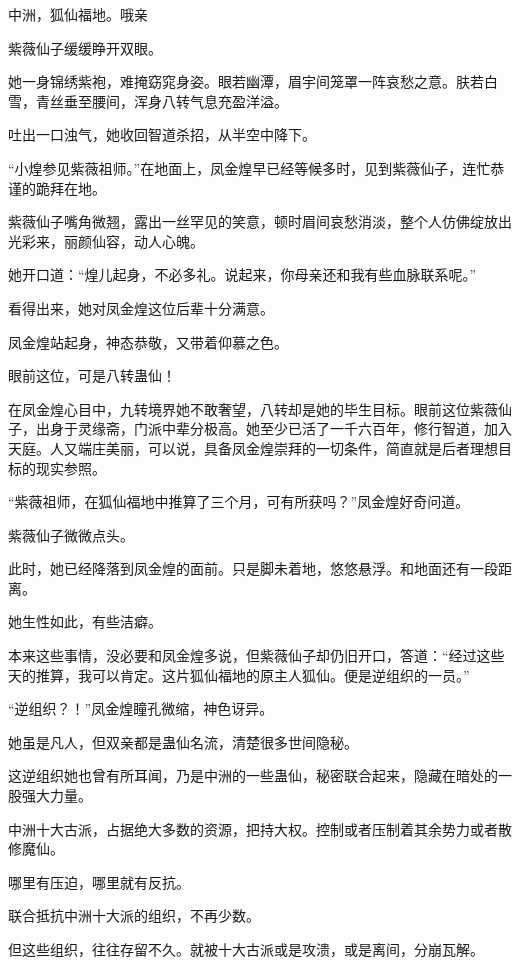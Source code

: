 
\begin{this_body}

中洲，狐仙福地。哦亲

紫薇仙子缓缓睁开双眼。

她一身锦绣紫袍，难掩窈窕身姿。眼若幽潭，眉宇间笼罩一阵哀愁之意。肤若白雪，青丝垂至腰间，浑身八转气息充盈洋溢。

吐出一口浊气，她收回智道杀招，从半空中降下。

“小煌参见紫薇祖师。”在地面上，凤金煌早已经等候多时，见到紫薇仙子，连忙恭谨的跪拜在地。

紫薇仙子嘴角微翘，露出一丝罕见的笑意，顿时眉间哀愁消淡，整个人仿佛绽放出光彩来，丽颜仙容，动人心魄。

她开口道：“煌儿起身，不必多礼。说起来，你母亲还和我有些血脉联系呢。”

看得出来，她对凤金煌这位后辈十分满意。

凤金煌站起身，神态恭敬，又带着仰慕之色。

眼前这位，可是八转蛊仙！

在凤金煌心目中，九转境界她不敢奢望，八转却是她的毕生目标。眼前这位紫薇仙子，出身于灵缘斋，门派中辈分极高。她至少已活了一千六百年，修行智道，加入天庭。人又端庄美丽，可以说，具备凤金煌崇拜的一切条件，简直就是后者理想目标的现实参照。

“紫薇祖师，在狐仙福地中推算了三个月，可有所获吗？”凤金煌好奇问道。

紫薇仙子微微点头。

此时，她已经降落到凤金煌的面前。只是脚未着地，悠悠悬浮。和地面还有一段距离。

她生性如此，有些洁癖。

本来这些事情，没必要和凤金煌多说，但紫薇仙子却仍旧开口，答道：“经过这些天的推算，我可以肯定。这片狐仙福地的原主人狐仙。便是逆组织的一员。”

“逆组织？！”凤金煌瞳孔微缩，神色讶异。

她虽是凡人，但双亲都是蛊仙名流，清楚很多世间隐秘。

这逆组织她也曾有所耳闻，乃是中洲的一些蛊仙，秘密联合起来，隐藏在暗处的一股强大力量。

中洲十大古派，占据绝大多数的资源，把持大权。控制或者压制着其余势力或者散修魔仙。

哪里有压迫，哪里就有反抗。

联合抵抗中洲十大派的组织，不再少数。

但这些组织，往往存留不久。就被十大古派或是攻溃，或是离间，分崩瓦解。


\end{this_body}
